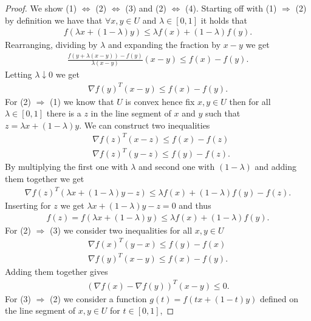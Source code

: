 \begin{proof}
    We show (1) $\Leftrightarrow$ (2) $\Leftrightarrow$ (3) and (2)
    $\Leftrightarrow$ (4). Starting off with (1) $\Rightarrow$ (2) by definition
    we have that $\forall x, y \in U$ and $\lambda \in [0, 1]$ it holds that
    \begin{align}
        f(\lambda x + (1-\lambda)y) \le \lambda f(x) + (1-\lambda)f(y).
    \end{align}
    Rearranging, dividing by $\lambda$ and expanding the fraction by $x-y$ we
    get
    \begin{align}
        \frac{f(y+\lambda(x-y)) - f(y)}{\lambda (x-y)}(x-y) \le f(x) - f(y).
    \end{align}
    Letting $\lambda \downarrow 0$ we get
    \begin{align}
        \nabla f(y)^{T} (x-y) \le f(x) - f(y).
    \end{align}
For (2) $\Rightarrow$ (1) we know that $U$ is convex hence fix $x, y \in U$
then for all $\lambda \in [0, 1]$ there is a $z$ in the line segment of $x$
and $y$ such that $z = \lambda x + (1-\lambda)y$. We can construct two
inequalities
\begin{align}
    &\nabla f(z)^{T} (x-z) \le f(x) - f(z) \\
    &\nabla f(z)^{T} (y-z) \le f(y) - f(z).
\end{align}
By multiplying the first one with $\lambda$ and second one with $(1-\lambda)$
and adding them together we get
\begin{align}
    \nabla f(z)^{T} (\lambda x + (1-\lambda)y - z) \le \lambda f(x) +
    (1-\lambda)f(y) - f(z).
\end{align}
Inserting for $z$ we get $\lambda x+ (1-\lambda)y - z =0$ and thus
\begin{align}
    f(z) = f(\lambda x + (1-\lambda)y) \le \lambda f(x) + (1-\lambda)f(y).
\end{align}
For (2) $\Rightarrow$ (3) we consider two inequalities for all $x, y \in U$
\begin{align}
    \nabla f(x)^{T} (y-x) \le f(y) - f(x) \\
    \nabla f(y)^{T} (x-y) \le f(x) - f(y).
\end{align}
Adding them together gives
\begin{align}
    (\nabla f(x) - \nabla f(y))^{T} (x-y) \le 0 .
\end{align}
For (3) $\Rightarrow$ (2) we consider a function $g(t) = f(t x + (1-t)y)$
defined on the line segment of $x, y \in U$ for $t \in [0, 1]$,

\end{proof}
